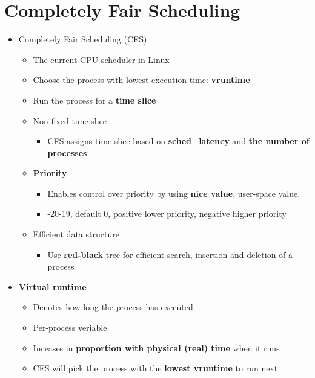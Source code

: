 \documentclass[a4paper,11pt,english]{article}
\begin{document}
\section*{Completely Fair Scheduling}
\begin{itemize}
    \item Completely Fair Scheduling (CFS)
        \begin{itemize}
            \item The current CPU scheduler in Linux
            \item Choose the process with lowest execution time: \textbf{\color{blue} vruntime}
            \item Run the process for a \textbf{\color{blue} time slice}
            \item Non-fixed time slice
                \begin{itemize}
                    \item CFS assigns time slice based on \textbf{\color{blue} sched\_latency} and \textbf{\color{blue} the number of processes}
                \end{itemize}
            \item \textbf{\color{blue} Priority}
                \begin{itemize}
                    \item Enables control over priority by using \textbf{\color{blue} nice value}, user-space value.
                    \item -20-19, default 0, positive lower priority, negative higher priority
                \end{itemize}
            \item Efficient data structure
                \begin{itemize}
                    \item Use \textbf{\color{blue} red-black} tree for efficient search, insertion and deletion of a process
                \end{itemize}
        \end{itemize}
    \item \textbf{\color{blue} Virtual runtime}
        \begin{itemize}
            \item Denotes how long the process has executed
            \item Per-process veriable
            \item Inceases in \textbf{proportion with physical (real) time} when it runs
            \item CFS will pick the process with the \textbf{lowest vruntime} to run next

\end{itemize}
\end{itemize}
\end{document}
